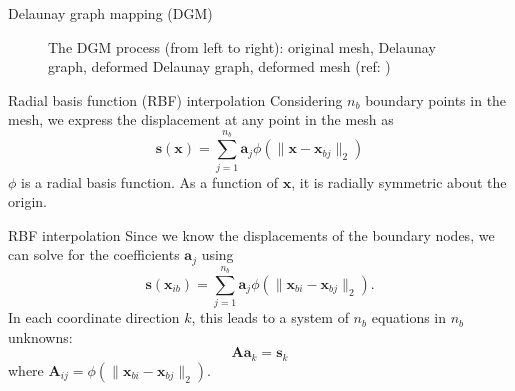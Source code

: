 \documentclass[t,12pt]{beamer}
\let\bld\boldsymbol
\begin{document}
\begin{frame}{Delaunay graph mapping (DGM)}
\begin{figure}
{ 	}
 	\caption{The DGM process (from left to right): original mesh, Delaunay graph, deformed Delaunay graph, deformed mesh (ref: )}
 	\label{fig:dgmprocess}
 \end{figure}
\end{frame}

\begin{frame}{Radial basis function (RBF) interpolation}
Considering $n_b$ boundary points in the mesh, we express the displacement at any point in the mesh as 
\begin{equation}
\mathbf{s}(\mathbf{x}) = \sum_{j=1}^{n_b} \mathbf{a}_j \phi(\lVert\mathbf{x} - \mathbf{x}_{bj}\rVert_2)
\label{eqn:rbf}
\end{equation}
$\phi$ is a radial basis function. As a function of $\bld{x}$, it is radially symmetric about the origin.
\end{frame}

\begin{frame}{RBF interpolation}
Since we know the displacements of the boundary nodes, we can solve for the coefficients $\mathbf{a}_j$ using
\begin{equation}
\mathbf{s}(\mathbf{x}_{ib}) = \sum_{j=1}^{n_b} \mathbf{a}_j \phi(\lVert\mathbf{x}_{bi} - \mathbf{x}_{bj}\rVert_2).
\end{equation}
In each coordinate direction $k$, this leads to a system of $n_b$ equations in $n_b$ unknowns:
\begin{equation}
\mathbf{A}\mathbf{a}_k = \mathbf{s}_k
\label{eqn:rbf_system}
\end{equation}
where $\bld{A}_{ij} = \phi(\lVert\mathbf{x}_{bi} - \mathbf{x}_{bj}\rVert_2)$.
\end{frame}
\end{document}
